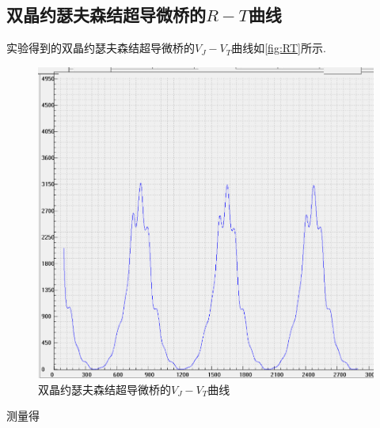 \documentclass[font=default]{mpltx}
\newcommand{\note}[1]{{\color{gray}#1}}
\newcommand*\cs[1]{\texttt{\textbackslash #1}}
\newcommand*\env[1]{\textit{\texttt{#1}}}
\begin{document}
\subsection{双晶约瑟夫森结超导微桥的$R-T$曲线}
实验得到的双晶约瑟夫森结超导微桥的$V_J-V_T$曲线如\autoref{fig:RT}所示.
\begin{figure}
  \centering
  \includegraphics[width=0.85\linewidth]{fig/3.png}
  \caption{双晶约瑟夫森结超导微桥的$V_J-V_T$曲线}
  \label{fig:RT}
\end{figure}

测量得





\end{document}
